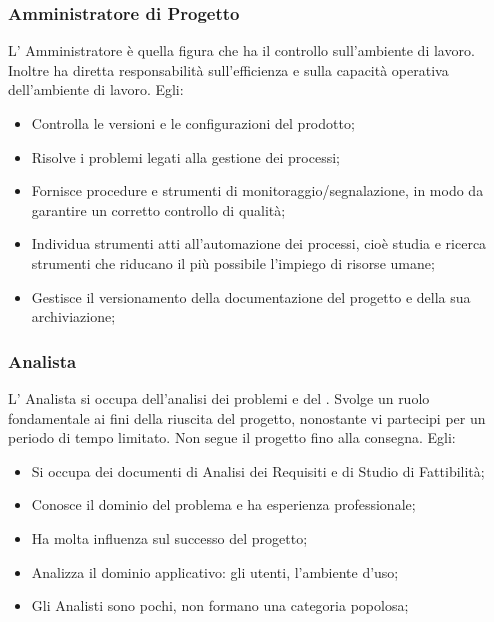 \subsubsection{Amministratore di Progetto}
L’ Amministratore è quella figura che ha il controllo sull'ambiente di lavoro. Inoltre ha diretta responsabilità sull'efficienza e sulla capacità operativa dell'ambiente di lavoro.
Egli:
\begin{itemize}
\item{Controlla le versioni e le configurazioni del prodotto;}
\item{Risolve i problemi legati alla gestione dei processi;}
\item{Fornisce procedure e strumenti di monitoraggio/segnalazione, in modo da garantire un corretto controllo di qualità;}
\item{Individua strumenti atti all’automazione dei processi, cioè studia e ricerca strumenti che riducano il più possibile l'impiego di risorse umane;}
\item{Gestisce il versionamento della documentazione del progetto e della sua archiviazione;}
\end{itemize}


\subsubsection{Analista}
L’ Analista si occupa dell’analisi dei problemi e del . Svolge un ruolo fondamentale ai fini della riuscita del progetto, nonostante vi partecipi per un periodo di tempo limitato. Non segue il progetto fino alla consegna.
Egli:
\begin{itemize}
\item{Si occupa dei documenti di Analisi dei Requisiti e di Studio di Fattibilità;}
\item{Conosce il dominio del problema e ha esperienza professionale;}
\item{Ha molta influenza sul successo del progetto;}
\item{Analizza il dominio applicativo:  gli utenti, l’ambiente d’uso;}
\item{Gli Analisti sono pochi, non formano una categoria popolosa;}
\end{itemize}


